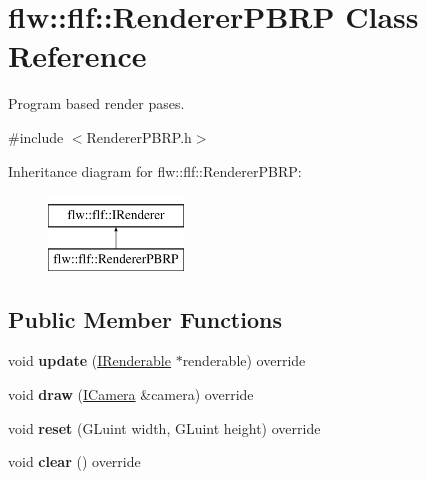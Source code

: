 \hypertarget{classflw_1_1flf_1_1RendererPBRP}{}\section{flw\+:\+:flf\+:\+:Renderer\+P\+B\+RP Class Reference}
\label{classflw_1_1flf_1_1RendererPBRP}


Program based render pases.  




{\ttfamily \#include $<$Renderer\+P\+B\+R\+P.\+h$>$}

Inheritance diagram for flw\+:\+:flf\+:\+:Renderer\+P\+B\+RP\+:\begin{figure}[H]
\begin{center}
\leavevmode
\includegraphics[height=2.000000cm]{classflw_1_1flf_1_1RendererPBRP}
\end{center}
\end{figure}
\subsection*{Public Member Functions}
\begin{DoxyCompactItemize}
\item 
\mbox{\label{classflw_1_1flf_1_1RendererPBRP_a3924b33dd9addf8b0ac6d9087a8e201b}} 
void {\bfseries update} (\hyperlink{classflw_1_1flf_1_1IRenderable}{I\+Renderable} $\ast$renderable) override
\item 
\mbox{\label{classflw_1_1flf_1_1RendererPBRP_af2dab0da144234969d5555703881ef59}} 
void {\bfseries draw} (\hyperlink{classflw_1_1flf_1_1ICamera}{I\+Camera} \&camera) override
\item 
\mbox{\label{classflw_1_1flf_1_1RendererPBRP_aaaf92db4563e63c56ff99ffa64e5ea76}} 
void {\bfseries reset} (G\+Luint width, G\+Luint height) override
\item 
\mbox{\label{classflw_1_1flf_1_1RendererPBRP_a8c931c099d7d57da4b086e1bab997609}} 
void {\bfseries clear} () override
\end{DoxyCompactItemize}
